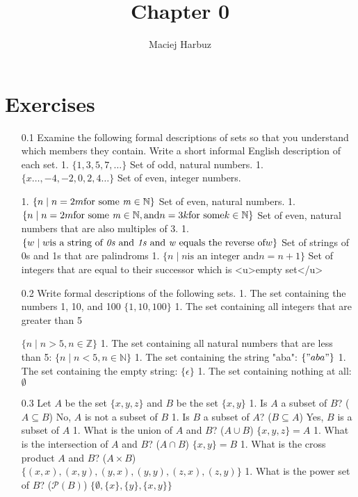 \documentclass[12pt, a4paper]{article}
\title{Chapter 0}
\author{Maciej Harbuz}
\begin{document}
\maketitle

\section{Exercises}

\begin{enumerate}

    \item[0.1]
Examine the following formal descriptions of sets so that you understand which members they contain. Write a short informal English description of each set.
1. $\{1, 3, 5, 7, \ldots \}$
Set of odd, natural numbers.
1. $\{x \ldots, -4, -2, 0, 2, 4 \ldots \}$
Set of even, integer numbers.

1. $\{n \mid n = 2m \text{for some \textit{m}} \in \mathbb{N} \}$
Set of even, natural numbers.
1. $\{n \mid n = 2m \text{for some \textit{m}} \in \mathbb{N}, \text{and} n = 3k \text{for some} k \in \mathbb{N} \}$
Set of even, natural numbers that are also multiples of 3.
1. $\{w \mid w  \text{is a string of \textit{0s} and \textit{1s} and \textit{w} equals the reverse of} w\}$
Set of strings of 0s and 1s that are palindroms 
1. $\{ n \mid n \text{is an integer and}  n = n+1\}$
Set of integers that are equal to their successor which is <u>empty set</u>
    \item[0.2]
Write  formal descriptions  of the following sets.
1. The set containing the numbers 1, 10, and 100
    $\{1, 10, 100\}$
1. The set containing all integers that are greater than 5
    

    $\{n \mid n > 5, n \in \mathbb{Z}\}$
1.  The set containing all natural numbers that are less than 5:
    $\{n \mid n < 5, n \in \mathbb{N}\}$
1. The set containing the string "aba":
    $\{"aba"\}$
1. The set containing the empty string:
    $\{\epsilon\}$
1. The set containing nothing at all:
    $\emptyset$
    \item[0.3]
Let $A$ be the set $\{x,y,z\}$ and $B$ be the set $\{x,y\}$
1. Is $A$ a subset of $B$? ($A \subseteq B$) 
    No, $A$ is not a subset of $B$
1. Is $B$ a subset of $A$? ($B \subseteq A$) 
    Yes, $B$ is a subset of $A$
1. What is the union of $A$ and $B$? ($A \cup B$) 
    $\{x,y,z\} = A$
1. What is the intersection of $A$ and $B$? ($A \cap B$) 
    $\{x,y\} = B$
1. What is the cross product $A$ and $B$? ($A \times B$) 
    $\{(x,x), (x,y), (y,x), (y,y), (z,x), (z,y)\}$
1. What is the power set of $B$? ($\mathcal{P}(B)$) 
    $\{\emptyset, \{x\}, \{y\}, \{x,y\}\}$


\end{enumerate}
\end{document}
